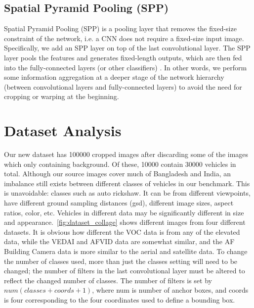 \subsection{Spatial Pyramid Pooling (SPP)}
 Spatial Pyramid Pooling (SPP) is a pooling layer that removes the fixed-size constraint of the network, i.e. a CNN does not require a fixed-size input image. Specifically, we add an SPP layer on top of the last convolutional layer. The SPP layer pools the features and generates fixed-length outputs, which are then fed into the fully-connected layers (or other classifiers) \cite{10.1007/978-3-319-10578-9_23}. In other words, we perform some information aggregation at a deeper stage of the network hierarchy (between convolutional layers and fully-connected layers) to avoid the need for cropping or warping at the beginning.
\newpage



\section{Dataset Analysis}
Our new dataset has 100000 cropped images after discarding some of the images which only containing background. Of these, 10000 contain 30000 vehicles in total. Although our source images cover much of Bangladesh and India, an imbalance still exists between different classes of vehicles in our benchmark. This is unavoidable: classes such as auto rickshaw. It can be from different viewpoints, have different ground sampling distances (gsd), different image sizes, aspect ratios, color, etc. Vehicles in different data may be significantly different in size and appearance.~\ref{fig:dataset_collage} shows different images from four different datasets. It is obvious how different the VOC data is from any of the elevated data, while the VEDAI and AFVID data are somewhat similar, and the AF Building Camera data is more similar to the aerial and satellite data. To change the number of classes used, more than just the classes setting will need to be changed; the number of filters in the last convolutional layer must be altered to reflect the changed number of classes. The number of filters is set by $num(classes + coords + 1)$, where num is number of anchor boxes, and coords is four corresponding to the four coordinates used to define a bounding box.

